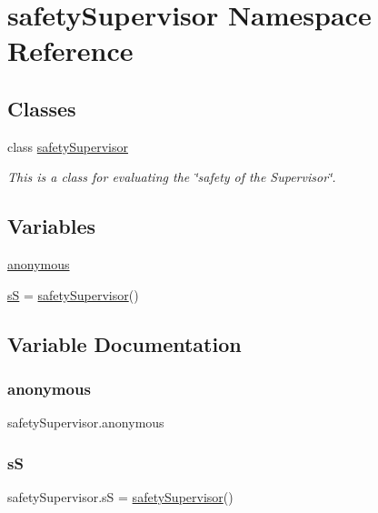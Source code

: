 \hypertarget{namespacesafetySupervisor}{}\section{safety\+Supervisor Namespace Reference}
\label{namespacesafetySupervisor}
\subsection*{Classes}
\begin{DoxyCompactItemize}
\item 
class \hyperlink{classsafetySupervisor_1_1safetySupervisor}{safety\+Supervisor}
\begin{DoxyCompactList}\small\item\em This is a class for evaluating the \char`\"{}safety of the Supervisor\char`\"{}. \end{DoxyCompactList}\end{DoxyCompactItemize}
\subsection*{Variables}
\begin{DoxyCompactItemize}
\item 
\hyperlink{namespacesafetySupervisor_ab9332624bdbffc606b516ac58d397f90}{anonymous}
\item 
\hyperlink{namespacesafetySupervisor_af6fe8549eb602b569a93fa71d153cc10}{sS} = \hyperlink{classsafetySupervisor_1_1safetySupervisor}{safety\+Supervisor}()
\end{DoxyCompactItemize}


\subsection{Variable Documentation}
\mbox{\label{namespacesafetySupervisor_ab9332624bdbffc606b516ac58d397f90}} 
\subsubsection{\texorpdfstring{anonymous}{anonymous}}
{\footnotesize\ttfamily safety\+Supervisor.\+anonymous}

\mbox{\label{namespacesafetySupervisor_af6fe8549eb602b569a93fa71d153cc10}} 
\subsubsection{\texorpdfstring{sS}{sS}}
{\footnotesize\ttfamily safety\+Supervisor.\+sS = \hyperlink{classsafetySupervisor_1_1safetySupervisor}{safety\+Supervisor}()}

